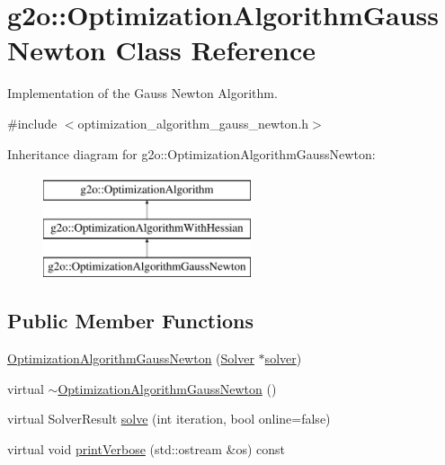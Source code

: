 \hypertarget{classg2o_1_1_optimization_algorithm_gauss_newton}{}\section{g2o\+:\+:Optimization\+Algorithm\+Gauss\+Newton Class Reference}
\label{classg2o_1_1_optimization_algorithm_gauss_newton}


Implementation of the Gauss Newton Algorithm.  




{\ttfamily \#include $<$optimization\+\_\+algorithm\+\_\+gauss\+\_\+newton.\+h$>$}

Inheritance diagram for g2o\+:\+:Optimization\+Algorithm\+Gauss\+Newton\+:\begin{figure}[H]
\begin{center}
\leavevmode
\includegraphics[height=3.000000cm]{classg2o_1_1_optimization_algorithm_gauss_newton}
\end{center}
\end{figure}
\subsection*{Public Member Functions}
\begin{DoxyCompactItemize}
\item 
\mbox{\hyperlink{classg2o_1_1_optimization_algorithm_gauss_newton_aca16df79fa14caf3e77bef0ca9aaedc4}{Optimization\+Algorithm\+Gauss\+Newton}} (\mbox{\hyperlink{classg2o_1_1_solver}{Solver}} $\ast$\mbox{\hyperlink{classg2o_1_1_optimization_algorithm_with_hessian_a85473a4073c76b1a52cf9cf175e31c45}{solver}})
\item 
virtual \mbox{\hyperlink{classg2o_1_1_optimization_algorithm_gauss_newton_ac86bc6829b12453693ee2c3967b11f0b}{$\sim$\+Optimization\+Algorithm\+Gauss\+Newton}} ()
\item 
virtual Solver\+Result \mbox{\hyperlink{classg2o_1_1_optimization_algorithm_gauss_newton_aba0b67eecaca01c576de7e605e5af5f1}{solve}} (int iteration, bool online=false)
\item 
virtual void \mbox{\hyperlink{classg2o_1_1_optimization_algorithm_gauss_newton_aff4c1b6a9f8a2e5c6777cfef9d4a18ba}{print\+Verbose}} (std\+::ostream \&os) const
\end{DoxyCompactItemize}

